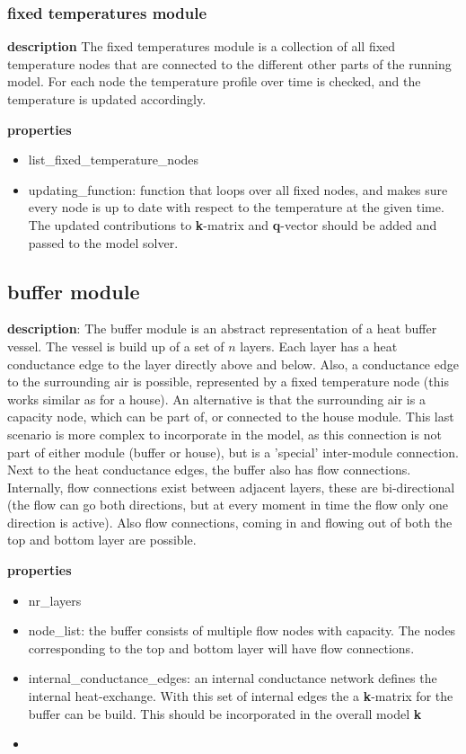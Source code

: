 \subsubsection{fixed temperatures module}
\textbf{description} The fixed temperatures module is a collection of all fixed temperature nodes that are connected to the different other parts of the running model. For each node the temperature profile over time is checked, and the temperature is updated accordingly. 

\textbf{properties}
\begin{itemize}
	\item list\_fixed\_temperature\_nodes
	\item updating\_function: function that loops over all fixed nodes, and makes sure every node is up to date with respect to the temperature at the given time. The updated contributions to \textbf{k}-matrix and \textbf{q}-vector should be added and passed to the model solver. 
\end{itemize}


\subsection{buffer module}
\textbf{description}: The buffer module is an abstract representation of a heat buffer vessel. The vessel is build up of a set of $n$ layers. Each layer has a heat conductance edge to the layer directly above and below. Also, a conductance edge to the surrounding air is possible, represented by a fixed temperature node (this works similar as for a house). An alternative is that the surrounding air is a capacity node, which can be part of, or connected to the house module. This last scenario is more complex to incorporate in the model, as this connection is not part of either module (buffer or house), but is a 'special' inter-module connection. Next to the heat conductance edges, the buffer also has flow connections. Internally, flow connections exist between adjacent layers, these are bi-directional (the flow can go both directions, but at every moment in time the flow only one direction is active). Also flow connections, coming in and flowing out of both the top and bottom layer are possible. 

\textbf{properties}
\begin{itemize}
	\item nr\_layers
	\item node\_list: the buffer consists of multiple flow nodes with capacity. The nodes corresponding to the top and bottom layer will have flow connections. 
	\item internal\_conductance\_edges: an internal conductance network defines the internal heat-exchange. With this set of internal edges the a  \textbf{k}-matrix  for the buffer can be build. This should be incorporated in the overall model \textbf{k}
	\item 
\end{itemize}

